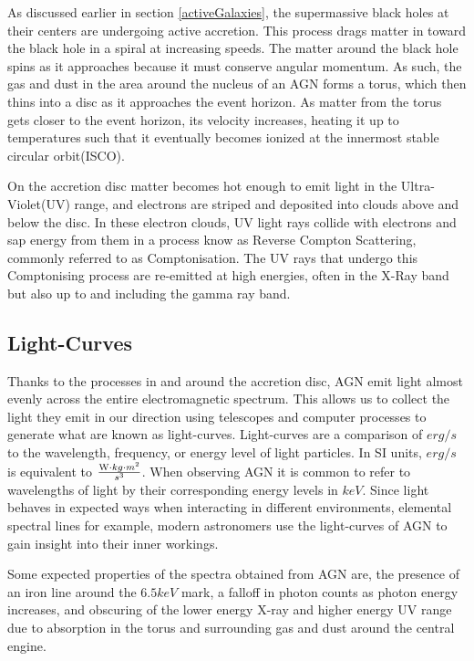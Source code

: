 \documentclass[12pt, oneside]{smuthesis}
\begin{document}
As discussed earlier in section \ref{activeGalaxies}, the supermassive black holes at their centers are undergoing active accretion. This process drags matter in toward the black hole in a spiral at increasing speeds. The matter around the black hole spins as it approaches because it must conserve angular momentum. As such, the gas and dust in the area around the nucleus of an AGN forms a torus, which then thins into a disc as it approaches the event horizon. As matter from the torus gets closer to the event horizon, its velocity increases, heating it up to temperatures such that it eventually becomes ionized at the innermost stable circular orbit(ISCO).

On the accretion disc matter becomes hot enough to emit light in the Ultra-Violet(UV) range, and electrons are striped and deposited into clouds above and below the disc. In these electron clouds, UV light rays collide with electrons and sap energy from them in a process know as Reverse Compton Scattering, commonly referred to as Comptonisation. The UV rays that undergo this Comptonising process are re-emitted at high energies, often in the X-Ray band but also up to and including the gamma ray band.

\subsection{\sc Light-Curves} \label{lightcurves}
Thanks to the processes in and around the accretion disc, AGN emit light almost evenly across the entire electromagnetic spectrum. This allows us to collect the light they emit in our direction using telescopes and computer processes to generate what are known as light-curves. Light-curves are a comparison of $erg/s$ to the wavelength, frequency, or energy level of light particles. In SI units, $erg/s$ is equivalent to $\frac{\textup{W}\cdot kg\cdot m^{2}}{s^{3}}$. When observing AGN it is common to refer to wavelengths of light by their corresponding energy levels in $keV$. Since light behaves in expected ways when interacting in different environments, elemental spectral lines for example, modern astronomers use the light-curves of AGN to gain insight into their inner workings.

Some expected properties of the spectra obtained from AGN are, the presence of an iron line around the $6.5 keV$ mark, a falloff in photon counts as photon energy increases, and obscuring of the lower energy X-ray and higher energy UV range due to absorption in the torus and surrounding gas and dust around the central engine.
\end{document}
